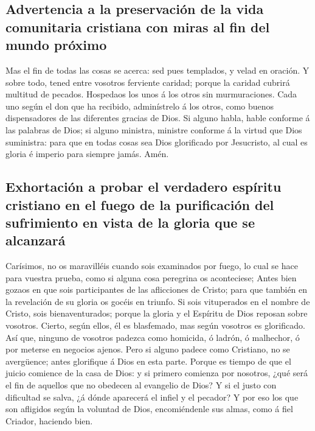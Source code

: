 \hypertarget{advertencia-a-la-preservaciuxf3n-de-la-vida-comunitaria-cristiana-con-miras-al-fin-del-mundo-pruxf3ximo}{%
\subsection{Advertencia a la preservación de la vida comunitaria
cristiana con miras al fin del mundo
próximo}\label{advertencia-a-la-preservaciuxf3n-de-la-vida-comunitaria-cristiana-con-miras-al-fin-del-mundo-pruxf3ximo}}

 Mas el fin de todas las cosas se acerca: sed pues
templados, y velad en oración.  Y sobre todo, tened entre
vosotros ferviente caridad; porque la caridad cubrirá multitud de
pecados.  Hospedaos los unos á los otros sin
murmuraciones.  Cada uno según el don que ha recibido,
adminístrelo á los otros, como buenos dispensadores de las diferentes
gracias de Dios.  Si alguno habla, hable conforme á las
palabras de Dios; si alguno ministra, ministre conforme á la virtud que
Dios suministra: para que en todas cosas sea Dios glorificado por
Jesucristo, al cual es gloria é imperio para siempre jamás. Amén.

\hypertarget{exhortaciuxf3n-a-probar-el-verdadero-espuxedritu-cristiano-en-el-fuego-de-la-purificaciuxf3n-del-sufrimiento-en-vista-de-la-gloria-que-se-alcanzaruxe1}{%
\subsection{Exhortación a probar el verdadero espíritu cristiano en el
fuego de la purificación del sufrimiento en vista de la gloria que se
alcanzará}\label{exhortaciuxf3n-a-probar-el-verdadero-espuxedritu-cristiano-en-el-fuego-de-la-purificaciuxf3n-del-sufrimiento-en-vista-de-la-gloria-que-se-alcanzaruxe1}}

 Carísimos, no os maravilléis cuando sois examinados por
fuego, lo cual se hace para vuestra prueba, como si alguna cosa
peregrina os aconteciese;  Antes bien gozaos en que sois
participantes de las aflicciones de Cristo; para que también en la
revelación de su gloria os gocéis en triunfo.  Si sois
vituperados en el nombre de Cristo, sois bienaventurados; porque la
gloria y el Espíritu de Dios reposan sobre vosotros. Cierto, según
ellos, él es blasfemado, mas según vosotros es glorificado.
 Así que, ninguno de vosotros padezca como homicida, ó
ladrón, ó malhechor, ó por meterse en negocios ajenos. 
Pero si alguno padece como Cristiano, no se avergüence; antes glorifique
á Dios en esta parte.  Porque es tiempo de que el juicio
comience de la casa de Dios: y si primero comienza por nosotros, ¿qué
será el fin de aquellos que no obedecen al evangelio de Dios?
 Y si el justo con dificultad se salva, ¿á dónde
aparecerá el infiel y el pecador?  Y por eso los que son
afligidos según la voluntad de Dios, encomiéndenle sus almas, como á
fiel Criador, haciendo bien.

